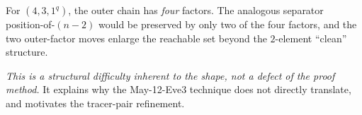 \documentclass[11pt]{article}
\theoremstyle{definition}
\begin{document}
For $(4, 3, 1^q)$, the outer chain has \emph{four} factors. The
analogous separator position-of-$(n-2)$ would be preserved by only
two of the four factors, and the two outer-factor moves enlarge the
reachable set beyond the $2$-element ``clean'' structure.

\emph{This is a structural difficulty inherent to the shape, not a
defect of the proof method.} It explains why the May-12-Eve3
technique does not directly translate, and motivates the
tracer-pair refinement.
\end{document}
